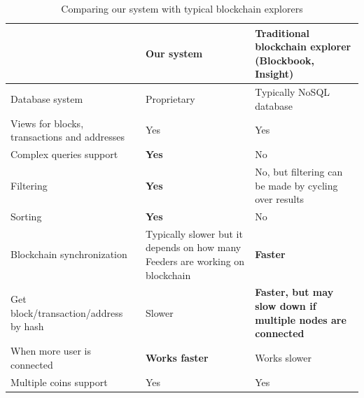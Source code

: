 \begin{table}
    \centering
    \begin{tabular}{| p{} | p{} | p{} |}
    \hline
    & \textbf{Our system}                                                                    & \textbf{Traditional blockchain explorer (Blockbook, Insight)}      \\ \hline
    Database system               & Proprietary                                                                         & Typically NoSQL database                                                        \\ \hline
    Views for blocks, transactions and addresses               & Yes                                                                         & Yes                                                        \\ \hline
    Complex queries support               & \textbf{Yes}                                                                         & No                                                        \\ \hline
    Filtering                             & \textbf{Yes}                                                                         & No, but filtering can be made by cycling over results     \\ \hline
    Sorting                               & \textbf{Yes}                                                                         & No                                                        \\ \hline
    Blockchain synchronization            & Typically slower but it depends on how many Feeders are working on blockchain & \textbf{Faster}                                                    \\ \hline
    Get block/transaction/address by hash & Slower                                                                        & \textbf{Faster, but may slow down if multiple nodes are connected} \\ \hline
    When more user is connected           & \textbf{Works faster}                                                                  & Works slower                                              \\ \hline
    Multiple coins support                & Yes                                                                          & Yes                                                \\ \hline
    \end{tabular}
    \caption{Comparing our system with typical blockchain explorers}
    \label{comparingTable}
\end{table}